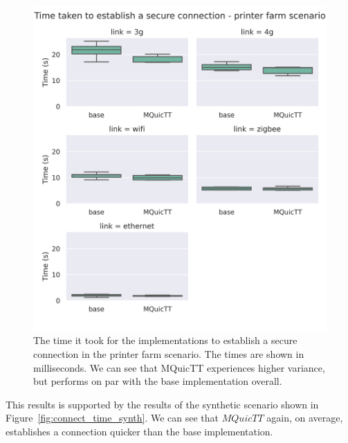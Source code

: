 \begin{figure}
    \centering
    \includegraphics[width=1\linewidth]{images/analysis_connection_time_farm.png}
    \caption{The time it took for the implementations to establish a secure connection in the printer farm scenario.
        The times are shown in milliseconds.
        We can see that MQuicTT experiences higher variance, but performs on par with the base implementation overall.}
    \label{fig:connect_time_farm}
\end{figure}

This results is supported by the results of the synthetic scenario shown in Figure~\ref{fig:connect_time_synth}.
We can see that $MQuicTT$ again, on average, establishes a connection quicker than the base implementation.



